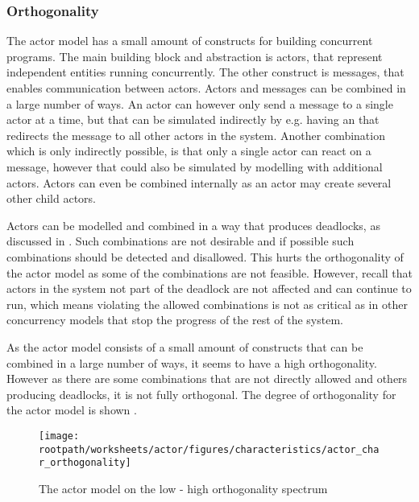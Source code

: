 \subsubsection{Orthogonality}\label{sec:actor_orthogonality}
The actor model has a small amount of constructs for building concurrent programs. The main building block and abstraction is actors, that represent independent entities running concurrently. The other construct is messages, that enables communication between actors. Actors and messages can be combined in a large number of ways. An actor can however only send a message to a single actor at a time, but that can be simulated indirectly by e.g. having an  that redirects the message to all other actors in the system. Another combination which is only indirectly possible, is that only a single actor can react on a message, however that could also be simulated by modelling with additional actors. Actors can even be combined internally as an actor may create several other child actors.

Actors can be modelled and combined in a way that produces deadlocks, as discussed in . Such combinations are not desirable and if possible such combinations should be detected and disallowed. This hurts the orthogonality of the actor model as some of the combinations are not feasible. However, recall that actors in the system not part of the deadlock are not affected and can continue to run, which means violating the allowed combinations is not as critical as in other concurrency models that stop the progress of the rest of the system.

As the actor model consists of a small amount of constructs that can be combined in a large number of ways, it seems to have a high orthogonality. However as there are some combinations that are not directly allowed and others producing deadlocks, it is not fully orthogonal. The degree of orthogonality for the actor model is shown .


\begin{figure}[htbp]
\centering
 \texttt{[image: \\rootpath/worksheets/actor/figures/characteristics/actor\_char\_orthogonality]} 
 \caption{The actor model on the low - high orthogonality spectrum}
\label{fig:actor_orthogonality}
\end{figure}

